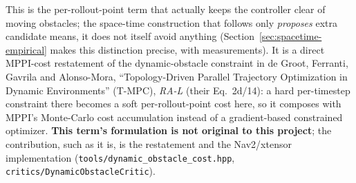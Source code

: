 \documentclass[11pt,a4paper]{article}
\begin{document}
This is the per-rollout-point term that actually keeps the controller clear
of moving obstacles; the space-time construction that follows only
\emph{proposes} extra candidate means, it does not itself avoid anything
(Section~\ref{sec:spacetime-empirical} makes this distinction precise, with
measurements). It
is a direct MPPI-cost restatement of the dynamic-obstacle constraint in de
Groot, Ferranti, Gavrila and Alonso-Mora, ``Topology-Driven Parallel
Trajectory Optimization in Dynamic Environments'' (T-MPC), \emph{RA-L}
(their Eq.~2d/14): a hard per-timestep constraint there becomes a soft
per-rollout-point cost here, so it composes with MPPI's Monte-Carlo cost
accumulation instead of a gradient-based constrained optimizer. \textbf{This
term's formulation is not original to this project}; the contribution, such
as it is, is the restatement and the Nav2/xtensor implementation
(\texttt{tools/dynamic\_obstacle\_cost.hpp},
\texttt{critics/DynamicObstacleCritic}).
\end{document}
